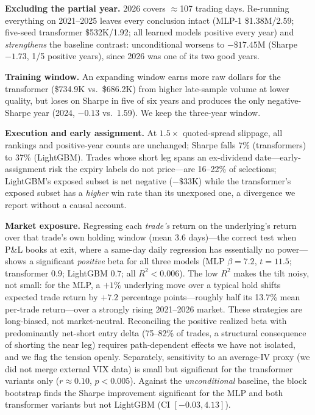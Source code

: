 \documentclass[sigconf,review,anonymous]{acmart}
\begin{document}
\noindent\textbf{Excluding the partial year.} 2026 covers $\approx$107 trading days. Re-running everything on 2021--2025 leaves every conclusion intact (MLP-1 \$1.38M/2.59; five-seed transformer \$532K/1.92; all learned models positive every year) and \emph{strengthens} the baseline contrast: unconditional worsens to $-\$17.45$M (Sharpe $-1.73$, 1/5 positive years), since 2026 was one of its two good years.

\noindent\textbf{Training window.} An expanding window earns more raw dollars for the transformer (\$734.9K vs.\ \$686.2K) from higher late-sample volume at lower quality, but loses on Sharpe in five of six years and produces the only negative-Sharpe year (2024, $-0.13$ vs.\ 1.59). We keep the three-year window.

\noindent\textbf{Execution and early assignment.} At $1.5\times$ quoted-spread slippage, all rankings and positive-year counts are unchanged; Sharpe falls 7\% (transformers) to 37\% (LightGBM). Trades whose short leg spans an ex-dividend date---early-assignment risk the expiry labels do not price---are 16--22\% of selections; LightGBM's exposed subset is net negative ($-\$33$K) while the transformer's exposed subset has a \emph{higher} win rate than its unexposed one, a divergence we report without a causal account.

\noindent\textbf{Market exposure.} Regressing each \emph{trade's} return on the underlying's return over that trade's own holding window (mean 3.6 days)---the correct test when P\&L books at exit, where a same-day daily regression has essentially no power---shows a significant \emph{positive} beta for all three models (MLP $\beta=7.2$, $t=11.5$; transformer $0.9$; LightGBM $0.7$; all $R^2<0.006$). The low $R^2$ makes the tilt noisy, not small: for the MLP, a $+1\%$ underlying move over a typical hold shifts expected trade return by $+7.2$ percentage points---roughly half its 13.7\% mean per-trade return---over a strongly rising 2021--2026 market. These strategies are long-biased, not market-neutral. Reconciling the positive realized beta with predominantly net-short entry delta (75--82\% of trades, a structural consequence of shorting the near leg) requires path-dependent effects we have not isolated, and we flag the tension openly. Separately, sensitivity to an average-IV proxy (we did not merge external VIX data) is small but significant for the transformer variants only ($r\approx0.10$, $p<0.005$). Against the \emph{unconditional} baseline, the block bootstrap finds the Sharpe improvement significant for the MLP and both transformer variants but not LightGBM (CI $[-0.03,4.13]$).
\end{document}
